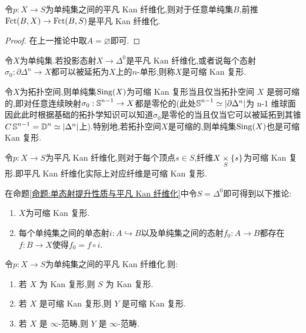 \begin{corollary}\label{推论:前推为平凡 Kan 纤维化}
    令$p: X \to S$为单纯集之间的平凡 Kan 纤维化,则对于任意单纯集$B$,前推$\operatorname{Fct}(B,X)\to \operatorname{Fct}(B,S)$是平凡 Kan 纤维化.
\end{corollary}
\begin{proof}
    在上一推论中取$A = \varnothing$即可.
\end{proof}
\begin{definition}[可缩 Kan 复形]
    令$X$为单纯集.若投影态射$X \to \Delta^0$是平凡 Kan 纤维化,或者说每个态射$\sigma_0 : \partial \Delta^n \to X$都可以被延拓为$X$上的$n$-单形,则称$X$是可缩 Kan 复形.
\end{definition}
\begin{example}
    令$X$为拓扑空间,则单纯集$\operatorname{Sing}(X)$为可缩 Kan 复形当且仅当拓扑空间 $X$ 是弱可缩的,即对任意连续映射$\sigma_0 : \operatorname{\mathbb{S}}^{n-1} \to X$都是零伦的(此处$\operatorname{\mathbb{S}}^{n-1}\simeq |\partial \Delta^n|$为 n-1 维球面因此此时根据基础的拓扑学知识可以知道$\sigma_0$是零伦的当且仅当它可以被延拓到其锥$C\operatorname{\mathbb{S}}^{n-1} = \operatorname{\mathbb{D}}^n \simeq |\Delta^n|$上).特别地,若拓扑空间$X$是可缩的,则单纯集$\operatorname{Sing}(X)$也是可缩 Kan 复形.
\end{example}
\begin{remark}\label{注记:平凡 Kan 纤维化与可缩 Kan 复形}
    令$p: X \to S$为平凡 Kan 纤维化,则对于每个顶点$s \in S$,纤维$X\underset{S}{\times} \{s\}$为可缩 Kan 复形.即平凡 Kan 纤维化实际上对应纤维是可缩 Kan 复形.
\end{remark}
在命题\ref{命题:单态射提升性质与平凡 Kan 纤维化}中令$S = \Delta^0$即可得到以下推论:
\begin{corollary}
    \begin{enumerate}
        \item $X$为可缩 Kan 复形.
        \item 每个单纯集之间的单态射$i : A \hookrightarrow B$以及单纯集之间的态射$f_0 : A\to B$都存在$f: B \to X$使得$f_0 = f \circ i$.
    \end{enumerate}
\end{corollary}
\begin{proposition}
    令$p: X \to S$为单纯集之间的平凡 Kan 纤维化.则:
    \begin{enumerate}
        \item 若 $X$ 为 Kan 复形,则 $S$ 为 Kan 复形.
        \item 若 $X$ 是可缩 Kan 复形,则 $Y$ 是可缩 Kan 复形.
        \item 若 $X$ 是 $\infty$-范畴,则 $Y$ 是 $\infty$-范畴.
    \end{enumerate}
\end{proposition}
